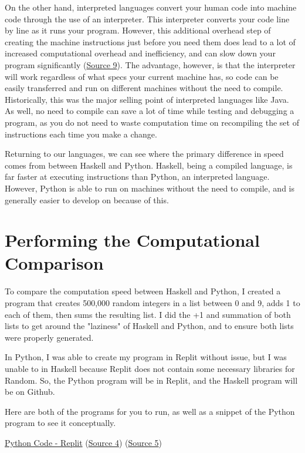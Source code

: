 \documentclass{article}
\begin{document}
    \medskip\noindent On the other hand, interpreted languages convert your human code into machine code through the use of an interpreter. This interpreter converts your code line by line as it runs your program. However, this additional overhead step of creating the machine instructions just before you need them does lead to a lot of increased computational overhead and inefficiency, and can slow down your program significantly (\href{https://www.freecodecamp.org/news/compiled-versus-interpreted-languages/}{Source 9}). The advantage, however, is that the interpreter will work regardless of what specs your current machine has, so code can be easily transferred and run on different machines without the need to compile. Historically, this was the major selling point of interpreted languages like Java. As well, no need to compile can save a lot of time while testing and debugging a program, as you do not need to waste computation time on recompiling the set of instructions each time you make a change.  
    
    \medskip\noindent Returning to our languages, we can see where the primary difference in speed comes from between Haskell and Python. Haskell, being a compiled language, is far faster at executing instructions than Python, an interpreted language. However, Python is able to run on machines without the need to compile, and is generally easier to develop on because of this. 
    

\section{Performing the Computational Comparison}
 To compare the computation speed between Haskell and Python, I created a program that creates 500,000 random integers in a list between 0 and 9, adds 1 to each of them, then sums the resulting list. I did the +1 and summation of both lists to get around the "laziness" of Haskell and Python, and to ensure both lists were properly generated. 
 
 \medskip\noindent In Python, I was able to create my program in Replit without issue, but I was unable to in Haskell because Replit does not contain some necessary libraries for Random. So, the Python program will be in Replit, and the Haskell program will be on Github. 
 
 \medskip\noindent Here are both of the programs for you to run, as well as a snippet of the Python program to see it conceptually.
 
 \medskip\href{https://replit.com/@ErikHombledal/PaperExamplePython#main.py} {Python Code - Replit} (\href{https://www.tutorialspoint.com/generating-random-number-list-in-python}{Source 4}) (\href{https://stackoverflow.com/questions/1557571/how-do-i-get-time-of-a-python-programs-execution} {Source 5})
 
\end{document}
